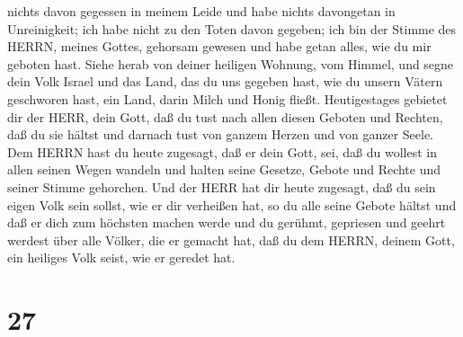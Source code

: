 nichts davon gegessen in meinem Leide und habe nichts davongetan in
Unreinigkeit; ich habe nicht zu den Toten davon gegeben; ich bin der
Stimme des HERRN, meines Gottes, gehorsam gewesen und habe getan alles,
wie du mir geboten hast.  Siehe herab von deiner heiligen
Wohnung, vom Himmel, und segne dein Volk Israel und das Land, das du uns
gegeben hast, wie du unsern Vätern geschworen hast, ein Land, darin
Milch und Honig fließt.  Heutigestages gebietet dir der
HERR, dein Gott, daß du tust nach allen diesen Geboten und Rechten, daß
du sie hältst und darnach tust von ganzem Herzen und von ganzer Seele.
 Dem HERRN hast du heute zugesagt, daß er dein Gott, sei,
daß du wollest in allen seinen Wegen wandeln und halten seine Gesetze,
Gebote und Rechte und seiner Stimme gehorchen.  Und der
HERR hat dir heute zugesagt, daß du sein eigen Volk sein sollst, wie er
dir verheißen hat, so du alle seine Gebote hältst  und daß
er dich zum höchsten machen werde und du gerühmt, gepriesen und geehrt
werdest über alle Völker, die er gemacht hat, daß du dem HERRN, deinem
Gott, ein heiliges Volk seist, wie er geredet hat.

\hypertarget{section-26}{%
\section{27}\label{section-26}}

